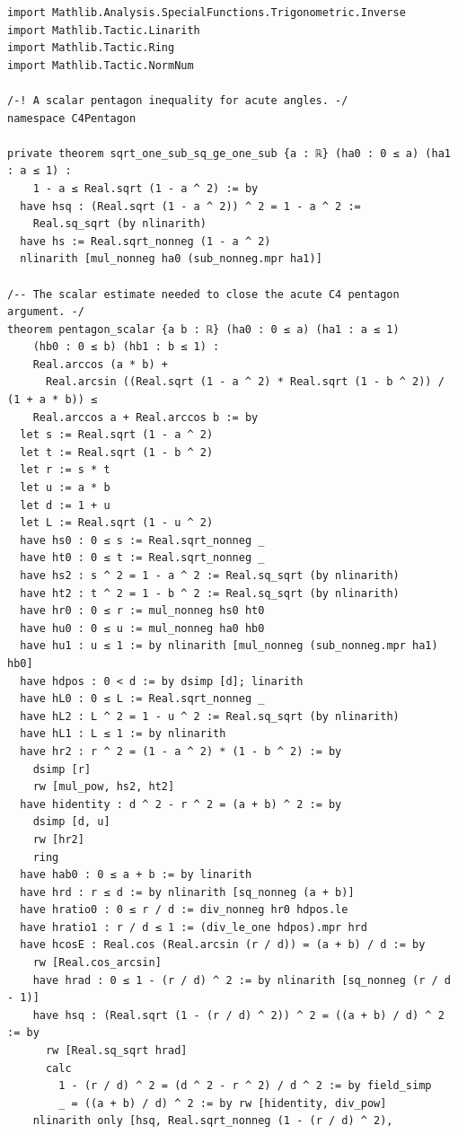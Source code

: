 \documentclass[11pt,a4paper]{article}
\begin{document}
\begin{Verbatim}[breaklines,breakanywhere,fontsize=\footnotesize]
import Mathlib.Analysis.SpecialFunctions.Trigonometric.Inverse
import Mathlib.Tactic.Linarith
import Mathlib.Tactic.Ring
import Mathlib.Tactic.NormNum

/-! A scalar pentagon inequality for acute angles. -/
namespace C4Pentagon

private theorem sqrt_one_sub_sq_ge_one_sub {a : ℝ} (ha0 : 0 ≤ a) (ha1 : a ≤ 1) :
    1 - a ≤ Real.sqrt (1 - a ^ 2) := by
  have hsq : (Real.sqrt (1 - a ^ 2)) ^ 2 = 1 - a ^ 2 :=
    Real.sq_sqrt (by nlinarith)
  have hs := Real.sqrt_nonneg (1 - a ^ 2)
  nlinarith [mul_nonneg ha0 (sub_nonneg.mpr ha1)]

/-- The scalar estimate needed to close the acute C4 pentagon argument. -/
theorem pentagon_scalar {a b : ℝ} (ha0 : 0 ≤ a) (ha1 : a ≤ 1)
    (hb0 : 0 ≤ b) (hb1 : b ≤ 1) :
    Real.arccos (a * b) +
      Real.arcsin ((Real.sqrt (1 - a ^ 2) * Real.sqrt (1 - b ^ 2)) / (1 + a * b)) ≤
    Real.arccos a + Real.arccos b := by
  let s := Real.sqrt (1 - a ^ 2)
  let t := Real.sqrt (1 - b ^ 2)
  let r := s * t
  let u := a * b
  let d := 1 + u
  let L := Real.sqrt (1 - u ^ 2)
  have hs0 : 0 ≤ s := Real.sqrt_nonneg _
  have ht0 : 0 ≤ t := Real.sqrt_nonneg _
  have hs2 : s ^ 2 = 1 - a ^ 2 := Real.sq_sqrt (by nlinarith)
  have ht2 : t ^ 2 = 1 - b ^ 2 := Real.sq_sqrt (by nlinarith)
  have hr0 : 0 ≤ r := mul_nonneg hs0 ht0
  have hu0 : 0 ≤ u := mul_nonneg ha0 hb0
  have hu1 : u ≤ 1 := by nlinarith [mul_nonneg (sub_nonneg.mpr ha1) hb0]
  have hdpos : 0 < d := by dsimp [d]; linarith
  have hL0 : 0 ≤ L := Real.sqrt_nonneg _
  have hL2 : L ^ 2 = 1 - u ^ 2 := Real.sq_sqrt (by nlinarith)
  have hL1 : L ≤ 1 := by nlinarith
  have hr2 : r ^ 2 = (1 - a ^ 2) * (1 - b ^ 2) := by
    dsimp [r]
    rw [mul_pow, hs2, ht2]
  have hidentity : d ^ 2 - r ^ 2 = (a + b) ^ 2 := by
    dsimp [d, u]
    rw [hr2]
    ring
  have hab0 : 0 ≤ a + b := by linarith
  have hrd : r ≤ d := by nlinarith [sq_nonneg (a + b)]
  have hratio0 : 0 ≤ r / d := div_nonneg hr0 hdpos.le
  have hratio1 : r / d ≤ 1 := (div_le_one hdpos).mpr hrd
  have hcosE : Real.cos (Real.arcsin (r / d)) = (a + b) / d := by
    rw [Real.cos_arcsin]
    have hrad : 0 ≤ 1 - (r / d) ^ 2 := by nlinarith [sq_nonneg (r / d - 1)]
    have hsq : (Real.sqrt (1 - (r / d) ^ 2)) ^ 2 = ((a + b) / d) ^ 2 := by
      rw [Real.sq_sqrt hrad]
      calc
        1 - (r / d) ^ 2 = (d ^ 2 - r ^ 2) / d ^ 2 := by field_simp
        _ = ((a + b) / d) ^ 2 := by rw [hidentity, div_pow]
    nlinarith only [hsq, Real.sqrt_nonneg (1 - (r / d) ^ 2),

\end{Verbatim}
\end{document}
